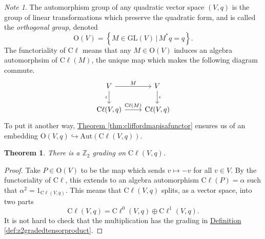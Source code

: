 \documentclass[a4paper,10pt]{scrreprt}
\newcommand{\Z}{\mathbb{Z}}
\newcommand{\cliff}{\mathrm{C}\ell}
\newcommand{\Or}{\mathrm{O}}
\newcommand{\GL}{\mathrm{GL}}
\theoremstyle{definition}
\theoremstyle{plain}
\newtheorem{theorem}{Theorem}[section]
\theoremstyle{remark}
\newtheorem{note}{Note}[section]
\begin{document}
\begin{note}
  The automorphism group of any quadratic vector space $(V,q)$ is the group of linear transformations which preserve the quadratic form, and is called the \emph{orthogonal group}, denoted 
  \begin{equation*}
    \Or(V) = \left\{ M \in \GL(V)\,\big|\, M^{*}q = q \right\}.
  \end{equation*}
  The functoriality of $\cliff$ means that any $M \in \Or(V)$ induces an algebra automorphsim of $\cliff(M)$, the unique map which makes the following diagram commute.
  \begin{equation*}
    \begin{tikzcd}
      V \arrow[d, swap, "\iota"] \arrow[r, "M"] & V \arrow[d, "\iota"] \\
      \cliff(V, q) \arrow[r, "\cliff(M)"] & \cliff(V, q)
    \end{tikzcd}
  \end{equation*}
  To put it another way, \hyperref[thm:cliffordmapisafunctor]{Theorem \ref*{thm:cliffordmapisafunctor}} ensures us of an embedding $\Or(V,q) \hookrightarrow \mathrm{Aut}(\cliff(V,q))$.
\end{note}

\begin{theorem}
  There is a $\Z_{2}$ grading on $\cliff(V,q)$.
\end{theorem}
\begin{proof}
  Take $P \in \Or(V)$ to be the map which sends $v \mapsto -v$ for all $v \in V$. By the functoriality of $\cliff$, this extends to an algebra automorphism $\cliff(P) = \alpha$ such that $\alpha^{2} = 1_{\cliff(V,q)}$. This means that $\cliff(V,q)$ splits, as a vector space, into two parts
  \begin{equation*}
    \cliff(V,q) = \cliff^{0}(V,q) \oplus \cliff^{1}(V,q).
  \end{equation*}
  It is not hard to check that the multiplication has the grading in \hyperref[def:z2gradedtensorproduct]{Definition \ref*{def:z2gradedtensorproduct}}.
\end{proof}
\end{document}
